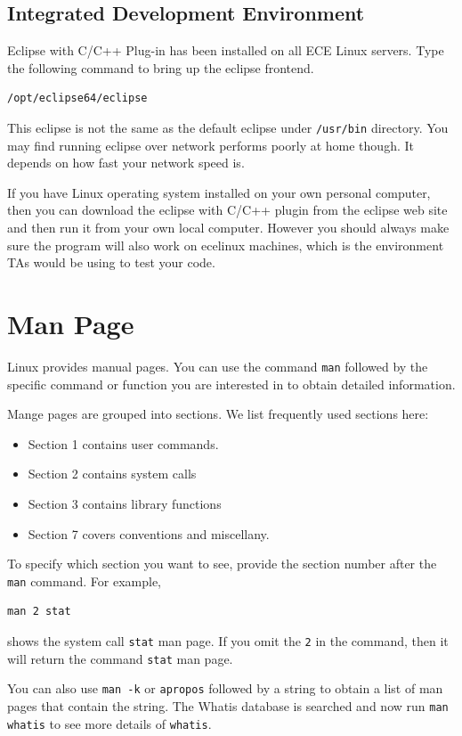 
\subsection{Integrated Development Environment}
Eclipse with C/C++ Plug-in has been installed on all ECE Linux servers. Type the following command to bring up the eclipse frontend.
\begin{lstlisting}[style=bash]
/opt/eclipse64/eclipse
\end{lstlisting}
This eclipse is not the same as the default eclipse under \verb+/usr/bin+ directory. You may find running eclipse over network performs poorly at home though. It depends on how fast your network speed is. 

If you have Linux operating system installed on your own personal computer, then you can download the eclipse with C/C++ plugin from the eclipse web site and then run it from your own local computer. However you should always make sure the program will also work on ecelinux machines, which is the environment TAs would be using to test your code.

\section{Man Page}
Linux provides manual pages. You can use the command \verb+man+ followed by the specific command or function you are interested in to obtain detailed information. 

Mange pages are grouped into sections. We list frequently used sections here: 
\begin{itemize}
\item Section 1 contains user commands.
\item Section 2 contains system calls
\item Section 3 contains library functions
\item Section 7 covers conventions and miscellany. 
\end{itemize}

To specify which section you want to see, provide the section number after the \verb+man+ command. For example,
\begin{lstlisting}[style=bash]
man 2 stat
\end{lstlisting}
shows the system call \verb+stat+ man page. If you omit the \verb+2+ in the command, then it will return the command \verb+stat+ man page.

You can also use \verb+man -k+  or \verb+apropos+ followed by a string to obtain a list of man pages that contain the string. The Whatis database is searched and now run \verb+man whatis+ to see more details of \verb+whatis+.

